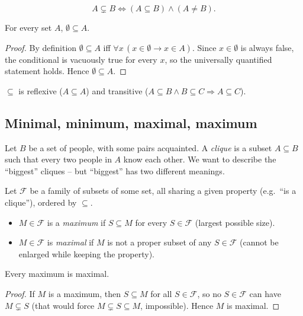 \begin{definition}
\[
A \subsetneq B \iff (A \subseteq B) \wedge (A \neq B).
\]
\end{definition}

\begin{proposition}
For every set $A$, $\emptyset \subseteq A$.
\end{proposition}
\begin{proof}
By definition $\emptyset \subseteq A$ iff $\forall x\,(x \in \emptyset \rightarrow x \in A)$. Since $x \in \emptyset$ is always false, the conditional is vacuously true for every $x$, so the universally quantified statement holds. Hence $\emptyset \subseteq A$.
\end{proof}

\begin{proposition}
$\subseteq$ is reflexive ($A \subseteq A$) and transitive ($A \subseteq B \wedge B \subseteq C \Rightarrow A \subseteq C$).
\end{proposition}

\subsection{Minimal, minimum, maximal, maximum}
\label{sec:1-7}
\begin{example}
Let $B$ be a set of people, with some pairs acquainted. A \emph{clique} is a subset $A \subseteq B$ such that every two people in $A$ know each other. We want to describe the ``biggest'' cliques -- but ``biggest'' has two different meanings.
\end{example}

\begin{definition}
Let $\mathcal{F}$ be a family of subsets of some set, all sharing a given property (e.g.\ ``is a clique''), ordered by $\subseteq$.
\begin{itemize}
    \item $M \in \mathcal{F}$ is a \emph{maximum} if $S \subseteq M$ for every $S \in \mathcal{F}$ (largest possible size).
    \item $M \in \mathcal{F}$ is \emph{maximal} if $M$ is not a proper subset of any $S \in \mathcal{F}$ (cannot be enlarged while keeping the property).
\end{itemize}
\end{definition}

\begin{proposition}
Every maximum is maximal.
\end{proposition}
\begin{proof}
If $M$ is a maximum, then $S \subseteq M$ for all $S \in \mathcal{F}$, so no $S \in \mathcal{F}$ can have $M \subsetneq S$ (that would force $M \subsetneq S \subseteq M$, impossible). Hence $M$ is maximal.
\end{proof}

